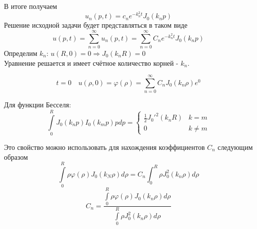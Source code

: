 В итоге получаем
\[u_n(p, t) = c_n e^{- k_n^2 t} J_0 (k_n p)\]
Решение исходной задачи будет представляться в таком виде
\[u(p, t) = \sum\limits_{n = 0}^{\infty} u_n (p, t) = \sum\limits_{n = 0}^{\infty} C_n e^{- k_n^2 t} J_0(k_n p)\]
Определим $k_n$: $u(R, 0) = 0 \Rightarrow J_0(k_n R) = 0$\\
Уравнение решается и имеет счётное количество корней - $k_n$.

\[
	t=0 \quad u(\rho, 0) = \varphi(\rho ) = \sum\limits_{n =0 }^{\infty} C_n J_0 (k_n \rho) e^0
\]

Для функции Бесселя:\\ 
	\[\int\limits_0^R J_0 (k_n p) I_0(k_m p) p dp = \begin{cases} \frac{1}{2} {J_0'}^2 (k_n R) & k=m \\ 0 & k \neq m \end{cases}\]

Это свойство можно использовать для нахождения коэффициентов $C_n$ следующим образом
\[
	\int\limits_0^R\rho\varphi(\rho) J_0(k_N \rho) d\rho = C_n \int_0^R \rho J_0^2 (k_n \rho) d \rho
\]
\[
	C_n =\frac{\int\limits_0^R \rho \varphi(\rho) J_0 (k_n \rho) d \rho}{\int\limits_0^R \rho J_0^2 (k_n\rho) d\rho}
	\]